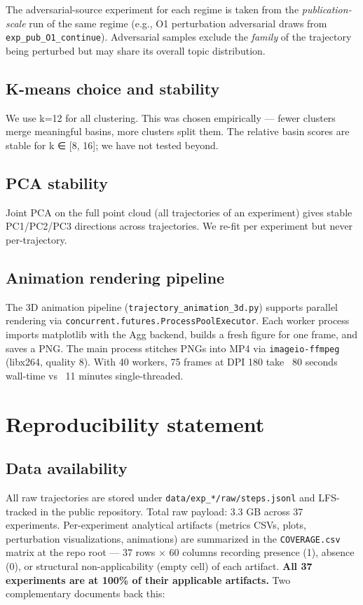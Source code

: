 \documentclass{article}
\theoremstyle{plain}
\theoremstyle{definition}
\begin{document}
The adversarial-source experiment for each regime is taken from the
\textit{publication-scale} run of the same regime (e.g., O1 perturbation
adversarial draws from \texttt{exp\_pub\_O1\_continue}). Adversarial samples
exclude the \textit{family} of the trajectory being perturbed but may share
its overall topic distribution.

\subsection{K-means choice and stability}

We use k=12 for all clustering. This was chosen empirically — fewer
clusters merge meaningful basins, more clusters split them. The
relative basin scores are stable for k ∈ [8, 16]; we have not tested
beyond.

\subsection{PCA stability}

Joint PCA on the full point cloud (all trajectories of an experiment)
gives stable PC1/PC2/PC3 directions across trajectories. We re-fit per
experiment but never per-trajectory.

\subsection{Animation rendering pipeline}

The 3D animation pipeline (\texttt{trajectory\_animation\_3d.py}) supports
parallel rendering via \texttt{concurrent.futures.ProcessPoolExecutor}. Each
worker process imports matplotlib with the Agg backend, builds a fresh
figure for one frame, and saves a PNG. The main process stitches PNGs
into MP4 via \texttt{imageio-ffmpeg} (libx264, quality 8). With 40 workers,
75 frames at DPI 180 take ~80 seconds wall-time vs ~11 minutes
single-threaded.


\section{Reproducibility statement}

\subsection{Data availability}

All raw trajectories are stored under \texttt{data/exp\_*/raw/steps.jsonl} and
LFS-tracked in the public repository. Total raw payload: 3.3 GB across
37 experiments. Per-experiment analytical artifacts (metrics CSVs,
plots, perturbation visualizations, animations) are summarized in the
\texttt{COVERAGE.csv} matrix at the repo root — 37 rows × 60 columns
recording presence (1), absence (0), or structural non-applicability
(empty cell) of each artifact. \textbf{All 37 experiments are at 100\% of
their applicable artifacts.} Two complementary documents back this:
\end{document}
